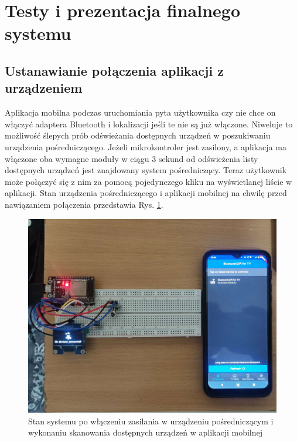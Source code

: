 \documentclass[12pt,twoside]{article}
\begin{document}

\clearpage



\section{Testy i prezentacja finalnego systemu}
\subsection{Ustanawianie połączenia aplikacji z urządzeniem}
Aplikacja mobilna podczas uruchomiania pyta użytkownika czy nie chce on włączyć adaptera Bluetooth i lokalizacji jeśli te nie są już włączone. Niweluje to możliwość ślepych prób odświeżania dostępnych urządzeń w poszukiwaniu urządzenia pośredniczącego. Jeżeli mikrokontroler jest zasilony, a aplikacja ma włączone oba wymagne moduły w ciągu 3 sekund od odświeżenia listy dostępnych urządzeń jest znajdowany system pośredniczący. Teraz użytkownik może połączyć się z nim za pomocą pojedynczego kliku na wyświetlanej liście w aplikacji. Stan urządzenia pośredniczącego i aplikacji mobilnej na chwilę przed nawiązaniem połączenia przedstawia Rys. \ref*{Fig:scanTest}.

\begin{figure}[ht]
   \centering
   \includegraphics[width=14cm]{images/scanTest.jpg}
   \caption{Stan systemu po włączeniu zasilania w urządzeniu pośredniczącym i wykonaniu skanowania dostępnych urządzeń w aplikacji mobilnej}
   \label{Fig:scanTest}
\end{figure}
\end{document}
